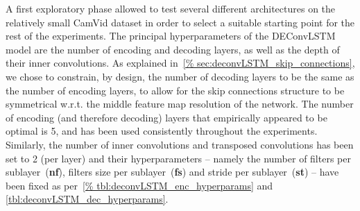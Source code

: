 A first exploratory phase allowed to test several different architectures on
the relatively small CamVid dataset in order to select a suitable starting
point for the rest of the experiments. The principal hyperparameters of the
DEConvLSTM model are the number of encoding and decoding layers, as well as the
depth of their inner convolutions. As explained in~\autoref{%
sec:deconvLSTM_skip_connections}, we chose to constrain, by design, the number
of decoding layers to be the same as the number of encoding layers, to allow
for the skip connections structure to be symmetrical w.r.t. the middle feature
map resolution of the network. The number of encoding (and therefore decoding)
layers that empirically appeared to be optimal is 5, and has been used
consistently throughout the experiments.  Similarly, the number of inner
convolutions and transposed convolutions has been set to 2 (per layer) and
their hyperparameters -- namely the number of filters per
sublayer~(\textbf{nf}), filters size per sublayer~(\textbf{fs}) and stride per
sublayer~(\textbf{st}) -- have been fixed as per~\autoref{%
tbl:deconvLSTM_enc_hyperparams} and \autoref{tbl:deconvLSTM_dec_hyperparams}.

\begin{table}[t]
    \caption{ConvLSTM hyperparameters. Number of filters per
        sublayer~(\textbf{nf}), filters size per sublayer~(\textbf{fs}) and
        stride per sublayer~(\textbf{st}).}
    \label{tbl:deconvLSTM_enc_hyperparams}
\end{table}


